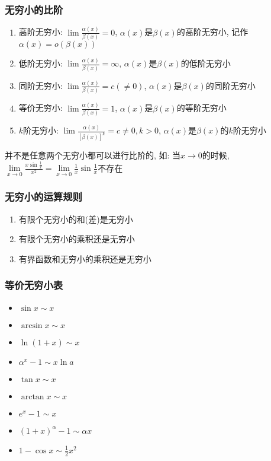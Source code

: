 \subsubsection{无穷小的比阶}
\begin{enumerate}
\item 高阶无穷小: $ \lim\limits \frac{\alpha(x)}{\beta(x)}=0 $, $ \alpha(x) $是$ \beta(x) $的高阶无穷小, 记作$ \alpha(x)=o(\beta(x)) $
\item 低阶无穷小: $ \lim\limits \frac{\alpha(x)}{\beta(x)}=\infty $, $ \alpha(x) $是$ \beta(x) $的低阶无穷小
\item 同阶无穷小: $ \lim\limits \frac{\alpha(x)}{\beta(x)}=c(\neq 0) $, $ \alpha(x) $是$ \beta(x) $的同阶无穷小
\item 等价无穷小: $ \lim\limits \frac{\alpha(x)}{\beta(x)}=1 $, $ \alpha(x) $是$ \beta(x) $的等阶无穷小
\item $ k $阶无穷小: $ \lim\limits \frac{\alpha(x)}{[\beta(x)]^{k}}=c\neq 0, k>0 $, $ \alpha(x) $是$ \beta(x) $的$ k $阶无穷小
\end{enumerate}
\begin{tcolorbox}
并不是任意两个无穷小都可以进行比阶的, 如: 当$ x \rightarrow 0 $的时候, $ \lim\limits_{x\rightarrow 0}\frac{x\sin \frac{1}{x}}{x^{2}}=\lim\limits_{x\rightarrow 0}\frac{1}{x}\sin \frac{1}{x} $不存在
\end{tcolorbox}
\subsubsection{无穷小的运算规则}
\begin{enumerate}
\item 有限个无穷小的和(差)是无穷小
\item 有限个无穷小的乘积还是无穷小
\item 有界函数和无穷小的乘积还是无穷小
\end{enumerate}
\subsubsection{等价无穷小表}
\begin{multicols}{2}
\begin{itemize}
\item $ \sin x\sim x $
\item $ \arcsin x\sim x $
\item $ \ln (1+x)\sim x $
\item $ \alpha^{x}-1\sim x\ln a $
\item $ \tan x\sim x $
\item $ \arctan x\sim x $
\item $ e^{x}-1\sim x $
\item $ (1+x)^{\alpha}-1\sim \alpha x $
\item $ 1-\cos x\sim \frac{1}{2}x^{2} $
\end{itemize}
\end{multicols}





